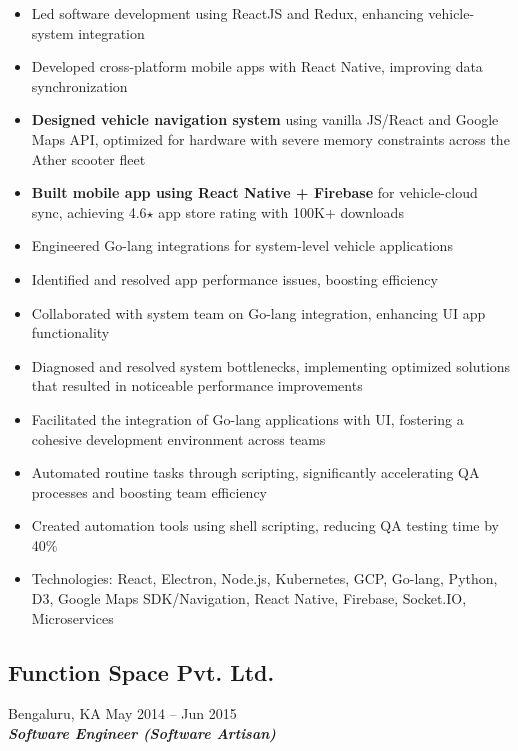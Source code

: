 \documentclass[10pt,a4paper]{article}
\begin{document}
\begin{itemize}[leftmargin=*, nosep]
  \item Led software development using ReactJS and Redux, enhancing vehicle-system integration
  \item Developed cross-platform mobile apps with React Native, improving data synchronization
  \item \textbf{Designed vehicle navigation system} using vanilla JS/React and Google Maps API, optimized for hardware with severe memory constraints across the Ather scooter fleet
  \item \textbf{Built mobile app using React Native + Firebase} for vehicle-cloud sync, achieving 4.6$\star$ app store rating with 100K+ downloads
  \item Engineered Go-lang integrations for system-level vehicle applications
  \item Identified and resolved app performance issues, boosting efficiency
  \item Collaborated with system team on Go-lang integration, enhancing UI app functionality
  \item Diagnosed and resolved system bottlenecks, implementing optimized solutions that resulted in noticeable performance improvements
  \item Facilitated the integration of Go-lang applications with UI, fostering a cohesive development environment across teams
  \item Automated routine tasks through scripting, significantly accelerating QA processes and boosting team efficiency
  \item Created automation tools using shell scripting, reducing QA testing time by 40\%
  \item Technologies: React, Electron, Node.js, Kubernetes, GCP, Go-lang, Python, D3, Google Maps SDK/Navigation, React Native, Firebase, Socket.IO, Microservices
\end{itemize}

\subsection*{\large Function Space Pvt. Ltd.}
\textcolor{datecolor}{Bengaluru, KA \textbar May 2014 -- Jun 2015} \\
\textbf{\textit{Software Engineer (Software Artisan)}}
\end{document}
